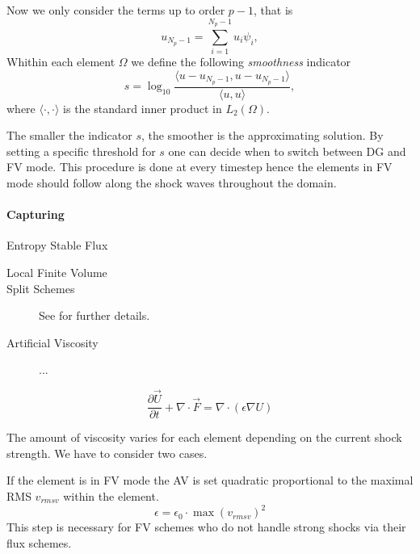 Now we only consider the terms up to order $p-1$, that is
\begin{equation}
    u_{N_p-1} = \sum^{N_p-1}_{i=1} u_i \psi_i,
\end{equation}
Whithin each element $\Omega$ we define the following \emph{smoothness} indicator
\begin{equation}
\label{eq:smoothnes-indicator}
    s = \log_{10} \frac{\langle u - u_{N_p-1}, u - u_{N_p-1} \rangle}{\langle u, u \rangle},
\end{equation}
where $\langle \cdot,\cdot \rangle$ is the standard inner product in $L_2(\Omega)$.

The smaller the indicator $s$, the smoother is the approximating solution.  By
setting a specific threshold for $s$ one can decide when to switch between DG
and FV mode. This procedure is done at every timestep hence the elements in FV mode
should follow along the shock waves throughout the domain.

\paragraph{Capturing}
\begin{description}
    \item[Entropy Stable Flux] \cite{derigs2016}
    \item[Local Finite Volume] 
    \item[Split Schemes] See \cite{gassner2016} for further details.
    \item[Artificial Viscosity] ...
\end{description}

\begin{equation}
\label{eq:persson-indicator-gov-equ}
    \frac{\partial\vec{U}}{\partial t} + \nabla \cdot \vec{F} = \nabla \cdot (\epsilon \nabla U)
\end{equation}

The amount of viscosity varies for each element depending on the current shock
strength. We have to consider two cases.

If the element is in FV mode the AV is set quadratic proportional to the
maximal RMS $v_{rmsv}$ within the element.
\begin{equation}
    \epsilon = \epsilon_0 \cdot \max(v_{rmsv})^2    
\end{equation}
This step is necessary for FV schemes who do not handle strong shocks via their
flux schemes.

